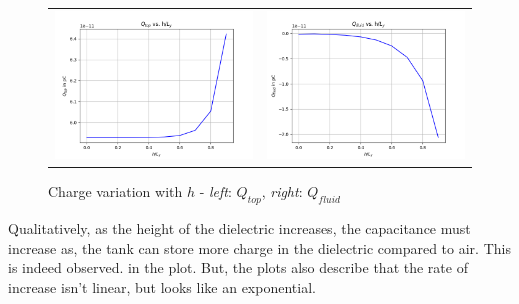 \documentclass[11pt, a4paper, twoside]{report}
\begin{document}
        \begin{figure}[H]
            \centering
            \setlength\tabcolsep{2pt}
            \begin{tabular}{cc}
                \includegraphics[scale=0.5]{Fig8.png} &
                \includegraphics[scale=0.5]{Fig9.png}\\
            \end{tabular}
            \caption{Charge variation with $h$ - \textit{left}: $Q_{top}$, \textit{right}: $Q_{fluid}$}
        \end{figure}

        Qualitatively, as the height of the dielectric increases, the capacitance must increase as, the tank can store more charge in the dielectric compared to air. This is indeed observed. in the plot. But, the plots also describe that the rate of increase isn't linear, but looks like an exponential.
\end{document}
